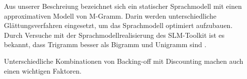 Aus unserer Beschreiung bezeichnet sich ein statischer Sprachmodell mit einen approximativen Modell von M-Gramm. Darin werden unterschiedliche Gl\"attungsverfahren eingesetzt, um das Sprachmodell optimiert aufzubauen.
Durch Versuche mit der Sprachmodellrealisierung des SLM-Toolkit ist es bekannt, dass Trigramm besser als Bigramm und Unigramm sind .

Unterschiedliche Kombinationen von Backing-off mit Discounting machen auch einen wichtigen Faktoren.
